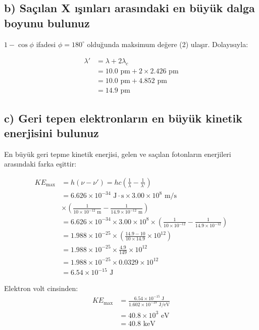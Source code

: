 \documentclass[11pt,letterpaper]{fenbil}
\begin{document}
\subsection{b) Saçılan X ışınları arasındaki en büyük dalga boyunu bulunuz}

$1 - \cos\phi$ ifadesi $\phi = 180^\circ$ olduğunda maksimum değere (2) ulaşır. Dolayısıyla:

\begin{align}
\lambda' &= \lambda + 2\lambda_c \\
&= 10.0 \text{ pm} + 2 \times 2.426 \text{ pm} \\
&= 10.0 \text{ pm} + 4.852 \text{ pm} \\
&= 14.9 \text{ pm}
\end{align}

\subsection{c) Geri tepen elektronların en büyük kinetik enerjisini bulunuz}

En büyük geri tepme kinetik enerjisi, gelen ve saçılan fotonların enerjileri arasındaki farka eşittir:

\begin{align}
KE_{\text{max}} &= h(\nu - \nu') = hc\left(\frac{1}{\lambda} - \frac{1}{\lambda'}\right) \\
&= 6.626 \times 10^{-34} \text{ J}\cdot\text{s} \times 3.00 \times 10^8 \text{ m/s} \\
&\times \left(\frac{1}{10 \times 10^{-12} \text{ m}} - \frac{1}{14.9 \times 10^{-12} \text{ m}}\right) \\
&= 6.626 \times 10^{-34} \times 3.00 \times 10^8 \times \left(\frac{1}{10 \times 10^{-12}} - \frac{1}{14.9 \times 10^{-12}}\right) \\
&= 1.988 \times 10^{-25} \times \left(\frac{14.9 - 10}{10 \times 14.9} \times 10^{12}\right) \\
&= 1.988 \times 10^{-25} \times \frac{4.9}{149} \times 10^{12} \\
&= 1.988 \times 10^{-25} \times 0.0329 \times 10^{12} \\
&= 6.54 \times 10^{-15} \text{ J}
\end{align}

Elektron volt cinsinden:
\begin{align}
KE_{\text{max}} &= \frac{6.54 \times 10^{-15} \text{ J}}{1.602 \times 10^{-19} \text{ J/eV}} \\
&= 40.8 \times 10^3 \text{ eV} \\
&= 40.8 \text{ keV}
\end{align}
\end{document}
